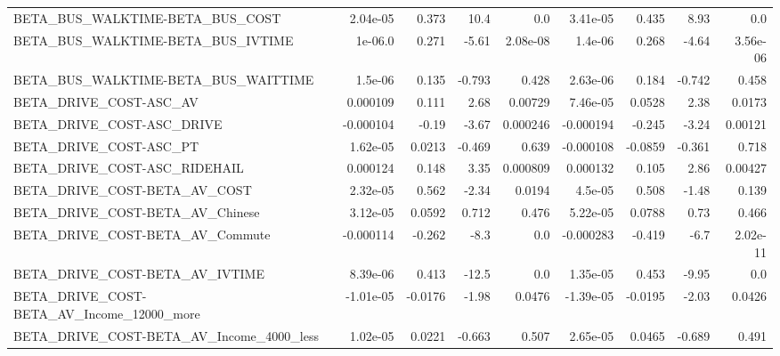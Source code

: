 \begin{tabular}{lrrrrrrrr}
BETA\_BUS\_WALKTIME-BETA\_BUS\_COST                    &    2.04e-05 &        0.373 &      10.4 &      0.0 &   3.41e-05 &       0.435 &         8.93 &           0.0 \\
BETA\_BUS\_WALKTIME-BETA\_BUS\_IVTIME                  &     1e-06.0 &        0.271 &     -5.61 & 2.08e-08 &    1.4e-06 &       0.268 &        -4.64 &      3.56e-06 \\
BETA\_BUS\_WALKTIME-BETA\_BUS\_WAITTIME                &     1.5e-06 &        0.135 &    -0.793 &    0.428 &   2.63e-06 &       0.184 &       -0.742 &         0.458 \\
BETA\_DRIVE\_COST-ASC\_AV                             &    0.000109 &        0.111 &      2.68 &  0.00729 &   7.46e-05 &      0.0528 &         2.38 &        0.0173 \\
BETA\_DRIVE\_COST-ASC\_DRIVE                          &   -0.000104 &        -0.19 &     -3.67 & 0.000246 &  -0.000194 &      -0.245 &        -3.24 &       0.00121 \\
BETA\_DRIVE\_COST-ASC\_PT                             &    1.62e-05 &       0.0213 &    -0.469 &    0.639 &  -0.000108 &     -0.0859 &       -0.361 &         0.718 \\
BETA\_DRIVE\_COST-ASC\_RIDEHAIL                       &    0.000124 &        0.148 &      3.35 & 0.000809 &   0.000132 &       0.105 &         2.86 &       0.00427 \\
BETA\_DRIVE\_COST-BETA\_AV\_COST                       &    2.32e-05 &        0.562 &     -2.34 &   0.0194 &    4.5e-05 &       0.508 &        -1.48 &         0.139 \\
BETA\_DRIVE\_COST-BETA\_AV\_Chinese                    &    3.12e-05 &       0.0592 &     0.712 &    0.476 &   5.22e-05 &      0.0788 &         0.73 &         0.466 \\
BETA\_DRIVE\_COST-BETA\_AV\_Commute                    &   -0.000114 &       -0.262 &      -8.3 &      0.0 &  -0.000283 &      -0.419 &         -6.7 &      2.02e-11 \\
BETA\_DRIVE\_COST-BETA\_AV\_IVTIME                     &    8.39e-06 &        0.413 &     -12.5 &      0.0 &   1.35e-05 &       0.453 &        -9.95 &           0.0 \\
BETA\_DRIVE\_COST-BETA\_AV\_Income\_12000\_more          &   -1.01e-05 &      -0.0176 &     -1.98 &   0.0476 &  -1.39e-05 &     -0.0195 &        -2.03 &        0.0426 \\
BETA\_DRIVE\_COST-BETA\_AV\_Income\_4000\_less           &    1.02e-05 &       0.0221 &    -0.663 &    0.507 &   2.65e-05 &      0.0465 &       -0.689 &         0.491 \\

\end{tabular}
